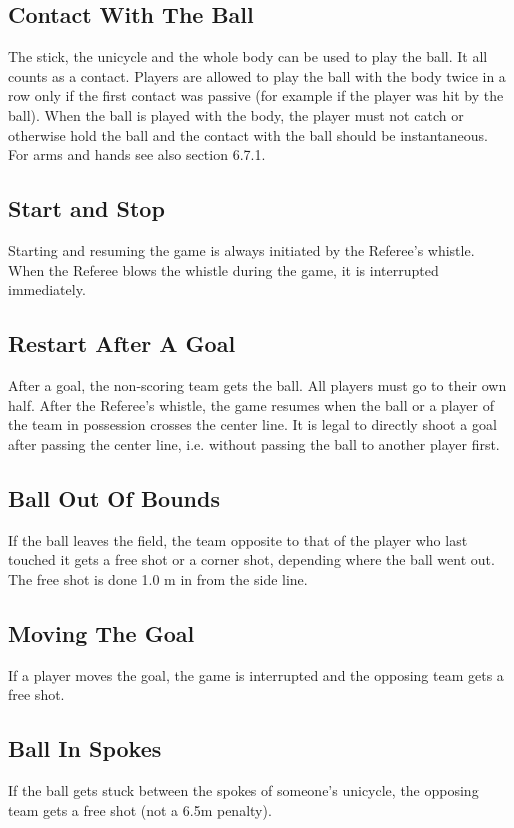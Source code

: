 \subsection{Contact With The Ball}
The stick, the unicycle and the whole body can be used to play the ball. It all counts as a contact. Players are allowed to
play the ball with the body twice in a row only if the first contact was passive (for example if the player was hit by the
ball). When the ball is played with the body, the player must not catch or otherwise hold the ball and the contact with
the ball should be instantaneous. For arms and hands see also section 6.7.1.

\subsection{Start and Stop}
Starting and resuming the game is always initiated by the Referee's whistle. When the Referee blows the whistle during
the game, it is interrupted immediately.

\subsection{Restart After A Goal}
After a goal, the non-scoring team gets the ball. All players must go to their own half. After the Referee's whistle, the
game resumes when the ball or a player of the team in possession crosses the center line. It is legal to directly shoot a
goal after passing the center line, i.e. without passing the ball to another player first.

\subsection{Ball Out Of Bounds}
If the ball leaves the field, the team opposite to that of the player who last touched it gets a free shot or a corner shot,
depending where the ball went out. The free shot is done 1.0 m in from the side line.

\subsection{Moving The Goal}
If a player moves the goal, the game is interrupted and the opposing team gets a free shot.

\subsection{Ball In Spokes}
If the ball gets stuck between the spokes of someone’s unicycle, the opposing team gets a free shot (not a 6.5m
penalty).

